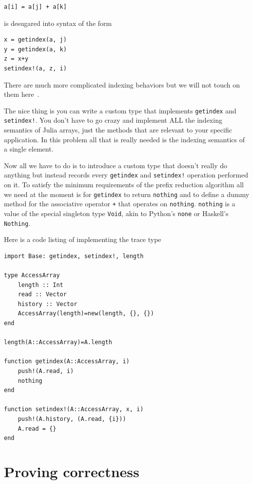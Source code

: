 \documentclass{sig-alternate}
\newcommand{\code}[1]{\texttt{#1}}
\newcommand{\TODO}[1]{\todo[inline]{#1}}
\begin{document}
\begin{verbatim}
a[i] = a[j] + a[k]
\end{verbatim}
is desugared into syntax of the form

\begin{verbatim}
x = getindex(a, j)
y = getindex(a, k)
z = x+y
setindex!(a, z, i)
\end{verbatim}

There are much more complicated indexing behaviors but we will not touch on them here~\cite{Bezanson2014}.

The nice thing is you can write a custom type that implements \code{getindex} and \code{setindex!}. You don't have to go crazy and implement ALL the indexing semantics of Julia arrays, just the methods that are relevant to your specific application. In this problem all that is really needed is the indexing semantics of a single element.

Now all we have to do is to introduce a custom type that doesn't really do anything but instead records every \code{getindex} and \code{setindex!} operation performed on it. To satisfy the minimum requirements of the prefix reduction algorithm all we need at the moment is for \code{getindex} to return \code{nothing} and to define a dummy method for the associative operator \code{+} that operates on \code{nothing}. \code{nothing} is a value of the special singleton type \code{Void}, akin to Python's \code{none} or Haskell's \code{Nothing}.

Here is a code listing of implementing the trace type

\begin{verbatim}
import Base: getindex, setindex!, length

type AccessArray
    length :: Int
    read :: Vector
    history :: Vector
    AccessArray(length)=new(length, {}, {})
end

length(A::AccessArray)=A.length

function getindex(A::AccessArray, i)
    push!(A.read, i)
    nothing
end

function setindex!(A::AccessArray, x, i)
    push!(A.history, (A.read, {i}))
    A.read = {}
end
\end{verbatim}

\TODO{Elaborate}

\section{Proving correctness}
\end{document}
